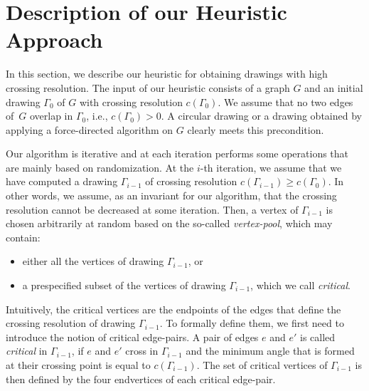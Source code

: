 \documentclass[runningheads]{llncs}
\begin{document}
\section{Description of our Heuristic Approach}
\label{sec:algorithm}

In this section, we describe our heuristic for obtaining drawings with high crossing resolution. The input of our heuristic consists of a graph $G$ and an initial drawing $\Gamma_0$ of $G$ with crossing resolution $c(\Gamma_0)$. We assume that no two edges of~$G$ overlap in $\Gamma_0$, i.e., $c(\Gamma_0)>0$. A circular drawing or a drawing obtained by applying a force-directed algorithm on $G$ clearly meets this precondition. 

Our algorithm is iterative and at each iteration performs some operations that are mainly based on randomization. At the $i$-th iteration, we assume that we have computed a drawing $\Gamma_{i-1}$ of crossing resolution $c(\Gamma_{i-1}) \geq c(\Gamma_0)$. 
In other words, we assume, as an invariant for our algorithm, that the crossing resolution cannot be decreased at some iteration. Then, a vertex of $\Gamma_{i-1}$ is chosen arbitrarily at random based on the so-called \emph{vertex-pool}, which may contain:

\begin{itemize}
\item either all the vertices of drawing $\Gamma_{i-1}$, or
\item a prespecified subset of the vertices of drawing $\Gamma_{i-1}$, which we call \emph{critical}.
\end{itemize}

Intuitively, the critical vertices are the endpoints of the edges that define the crossing resolution of drawing $\Gamma_{i-1}$. To formally define them, we first need to introduce the notion of critical edge-pairs. A pair of edges $e$ and $e'$ is called \emph{critical} in $\Gamma_{i-1}$, if $e$ and $e'$ cross in $\Gamma_{i-1}$ and the minimum angle that is formed at their crossing point is equal to $c(\Gamma_{i-1})$. The set of critical vertices of $\Gamma_{i-1}$ is then defined by the four endvertices of each critical edge-pair.  
\end{document}
